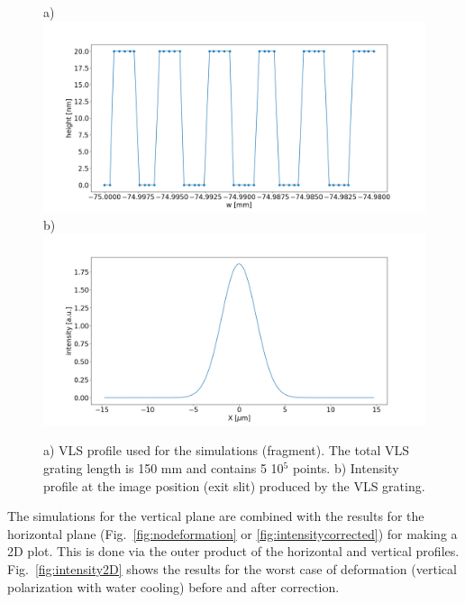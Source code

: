 \documentclass[preprint]{iucr}              %
\begin{document}
  \begin{figure}
  \label{fig:grating} 
  \begin{center}

  a)\\
  \includegraphics[width=1\textwidth]{figures/grating.png} 
  b) \\
   \includegraphics[width=1\textwidth]{figures/intensitygrating.png}


  \end{center}
  \caption
  { 
a) VLS profile used for the simulations (fragment). The total VLS grating length is 150 mm and contains 5 10$^5$ points. b) Intensity profile at the image position (exit slit) produced by the VLS grating.   
}
  \end{figure}


The simulations for the vertical plane are combined with the results for the horizontal plane (Fig.~\ref{fig:nodeformation} or \ref{fig:intensitycorrected}) for making a 2D plot. This is done via the outer product of the horizontal and vertical profiles. Fig.~\ref{fig:intensity2D} shows the results for the worst case of deformation (vertical polarization with water cooling) before and after correction. 
\end{document}
